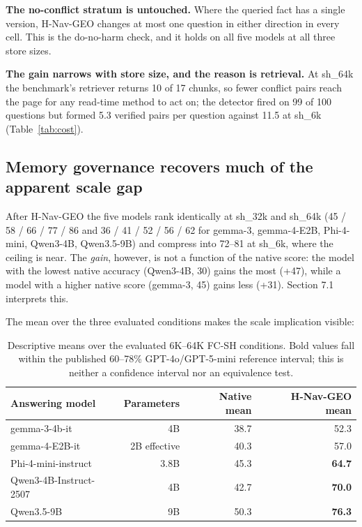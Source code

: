 \documentclass[journal=jcisd8,manuscript=article]{achemso}
\begin{document}
\textbf{The no-conflict stratum is untouched.} Where the queried fact has a single version, H-Nav-GEO changes at most one question in either direction in every cell. This is the do-no-harm check, and it holds on all five models at all three store sizes.

\textbf{The gain narrows with store size, and the reason is retrieval.} At sh\_64k the benchmark's retriever returns 10 of 17 chunks, so fewer conflict pairs reach the page for any read-time method to act on; the detector fired on 99 of 100 questions but formed 5.3 verified pairs per question against 11.5 at sh\_6k (Table~\ref{tab:cost}).


\subsection{Memory governance recovers much of the apparent scale gap}\label{sec:scale-results}

After H-Nav-GEO the five models rank identically at sh\_32k and sh\_64k (45 / 58 / 66 / 77 / 86 and 36 / 41 / 52 / 56 / 62 for gemma-3, gemma-4-E2B, Phi-4-mini, Qwen3-4B, Qwen3.5-9B) and compress into 72--81 at sh\_6k, where the ceiling is near. The \emph{gain}, however, is not a function of the native score: the model with the lowest native accuracy (Qwen3-4B, 30) gains the most (+47), while a model with a higher native score (gemma-3, 45) gains less (+31). Section 7.1 interprets this.

The mean over the three evaluated conditions makes the scale implication visible:



\begin{table}[H]\centering\small
\caption{Descriptive means over the evaluated 6K--64K FC-SH conditions. Bold values fall within the published 60--78\% GPT-4o/GPT-5-mini reference interval; this is neither a confidence interval nor an equivalence test.}\label{tab:scale}
\begin{tabular}{lrrr}\toprule
Answering model & Parameters & Native mean & H-Nav-GEO mean\\\midrule
gemma-3-4b-it & 4B & 38.7 & 52.3\\
gemma-4-E2B-it & 2B effective & 40.3 & 57.0\\
Phi-4-mini-instruct & 3.8B & 45.3 & \textbf{64.7}\\
Qwen3-4B-Instruct-2507 & 4B & 42.7 & \textbf{70.0}\\
Qwen3.5-9B & 9B & 50.3 & \textbf{76.3}\\\bottomrule
\end{tabular}\end{table}
\end{document}
